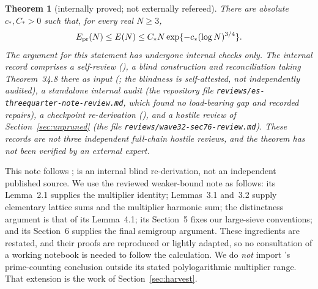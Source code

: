\documentclass[10pt,reqno]{amsart}
\newtheorem{theorem}{Theorem}[section]
\theoremstyle{remark}
\begin{document}
\begin{theorem}[internally proved; not externally refereed]\label{thm:main}
There are absolute $c_*,C_*>0$ such that, for every real
$N\geq3$,
\[
 E_{\rm pr}(N)\leq E(N)\leq C_*N\exp\{-c_*(\log N)^{3/4}\}.
\]
The argument for this statement has undergone internal checks only.
The internal record comprises a self-review (\cite[\S39.7]{Notes}), a
blind construction and reconciliation taking Theorem~34.8 there as
input (\cite[\S41]{Notes}; the blindness is self-attested, not
independently audited), a standalone internal audit (the repository
file \texttt{reviews/es-threequarter-note-review.md}, which found no
load-bearing gap and recorded repairs), a checkpoint re-derivation
(\cite[\S76.4]{Notes}), and a hostile review of Section~\ref{sec:unpruned}
(the file \texttt{reviews/wave32-sec76-review.md}).  These records are not three
independent full-chain hostile reviews, and the theorem has not been
verified by an external expert.
\end{theorem}

This note follows \cite[\S\S16,34,39]{Notes}; \cite[\S41]{Notes} is an
internal blind re-derivation, not an independent published source.
We use the reviewed weaker-bound note \cite{LL} as follows:
its Lemma~2.1 supplies the multiplier identity; Lemmas~3.1 and~3.2
supply elementary lattice sums and the multiplier harmonic sum;
the distinctness argument is that of its Lemma~4.1; its Section~5 fixes
our large-sieve conventions; and its Section~6 supplies the final
semigroup argument.  These ingredients are restated, and their proofs
are reproduced or lightly adapted, so no consultation of a working
notebook is needed to follow the calculation.  We do \emph{not} import
\cite[Lemma~4.1]{LL}'s prime-counting conclusion outside its stated
polylogarithmic multiplier range.  That extension is the work of
Section~\ref{sec:harvest}.
\end{document}
